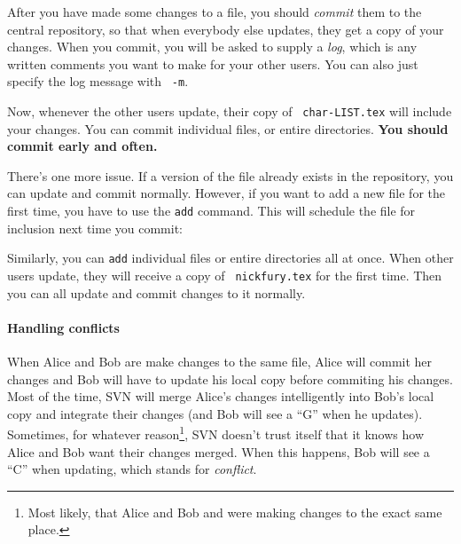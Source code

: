 \documentclass[green]{testgame}
\begin{document}
After you have made some changes to a file, you should {\em commit}
them to the central repository, so that when everybody else updates,
they get a copy of your changes. When you commit, you will be asked to
supply a {\em log}, which is any written comments you want to make for
your other users. You can also just specify the log message with {\tt
-m}.


Now, whenever the other users update, their copy of {\tt
char-LIST.tex} will include your changes. You can commit individual
files, or entire directories. {\bf You should commit early and often.}

There's one more issue. If a version of the file already exists in the
repository, you can update and commit normally. However, if you want
to add a new file for the first time, you have to use the {\tt add}
command. This will schedule the file for inclusion next time you
commit:


Similarly, you can {\tt add} individual files or entire directories
all at once. When other users update, they will receive a copy of {\tt
nickfury.tex} for the first time. Then you can all update and commit
changes to it normally.


\paragraph*{Handling conflicts}

When Alice and Bob are make changes to the same file, Alice will
commit her changes and Bob will have to update his local copy before
commiting his changes. Most of the time, SVN will merge Alice's
changes intelligently into Bob's local copy and integrate their
changes (and Bob will see a ``G'' when he updates). Sometimes, for
whatever reason\footnote{Most likely, that Alice and Bob and were
making changes to the exact same place.}, SVN doesn't trust itself
that it knows how Alice and Bob want their changes merged. When this
happens, Bob will see a ``C'' when updating, which stands for {\em
conflict}.
\end{document}
